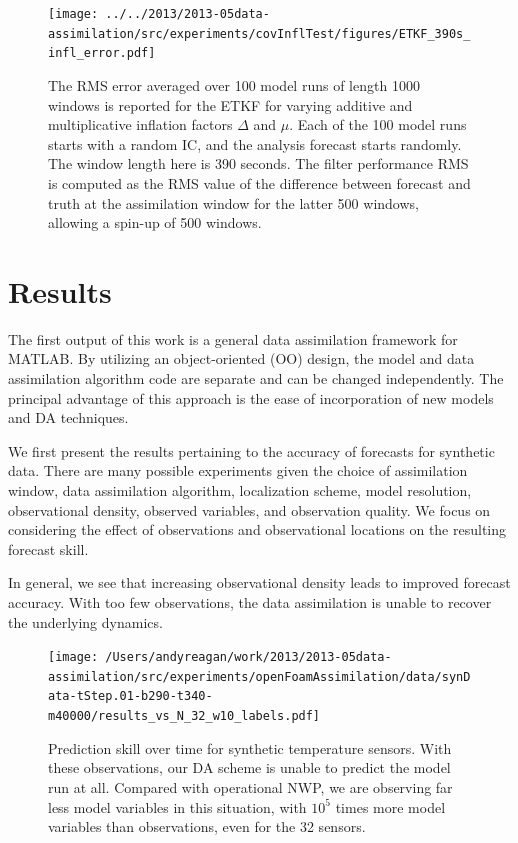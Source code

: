 \begin{figure}[h!]
  \centering
  \texttt{[image: ../../2013/2013-05data-assimilation/src/experiments/covInflTest/figures/ETKF\_390s\_infl\_error.pdf]}
  \caption[The RMS error averaged over 100 model runs of length 1000 windows is reported for the ETKF for varying additive and multiplicative inflation factors]{
    The RMS error averaged over 100 model runs of length 1000 windows is reported for the ETKF for varying additive and multiplicative inflation factors $\Delta$ and $\mu$.
    Each of the 100 model runs starts with a random IC, and the analysis forecast starts randomly.
    The window length here is 390 seconds.
    The filter performance RMS is computed as the RMS value of the difference between forecast and truth at the assimilation window for the latter 500 windows, allowing a spin-up of 500 windows.
  }
  \label{fig:ETKF_cov_tuning_390s}

\end{figure}

\section{Results}

The first output of this work is a general data assimilation framework for MATLAB.
By utilizing an object-oriented (OO) design, the model and data assimilation algorithm code are separate and can be changed independently.
The principal advantage of this approach is the ease of incorporation of new models and DA techniques.

We first present the results pertaining to the accuracy of forecasts for synthetic data.
There are many possible experiments given the choice of assimilation window, data assimilation algorithm, localization scheme, model resolution, observational density, observed variables, and observation quality.
We focus on considering the effect of observations and observational locations on the resulting forecast skill.

In general, we see that increasing observational density leads to improved forecast accuracy.
With too few observations, the data assimilation is unable to recover the underlying dynamics.

\begin{figure}[h!]
  \centering
  \texttt{[image: /Users/andyreagan/work/2013/2013-05data-assimilation/src/experiments/openFoamAssimilation/data/synData-tStep.01-b290-t340-m40000/results\_vs\_N\_32\_w10\_labels.pdf]}
  \caption[Prediction skill over time for synthetic temperature sensors]{
    Prediction skill over time for synthetic temperature sensors.
    With these observations, our DA scheme is unable to predict the model run at all.
    Compared with operational NWP, we are observing far less model variables in this situation, with $10^5$ times more model variables than observations, even for the 32 sensors.
  }
  \label{fig:TsensorExp}
\end{figure}

